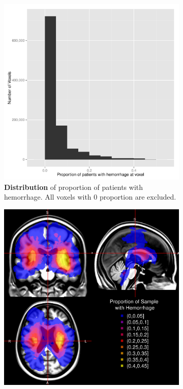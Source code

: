 \documentclass[final]{beamer}\usepackage[]{graphicx}\usepackage[]{color}
\begin{document}
\begin{frame}[fragile]
\begin{multicols}{2}
\begin{figure}[htbp]
 \begin{subfigure}[t]{0.4\linewidth} 
  \includegraphics[width=\linewidth]{reoriented_Binary_Sum_Image_histogram.pdf}
   \caption{\textbf{Distribution} of proportion of patients with hemorrhage. All voxels with 0 proportion are excluded.}
  \label{prop:hist}
  \end{subfigure}
 \;\begin{subfigure}[t]{.4\linewidth} 
    \includegraphics[width=\linewidth]{Figure4_Proportion.png}

\end{subfigure}
\end{figure}
\end{multicols}
\end{frame}
\end{document}

